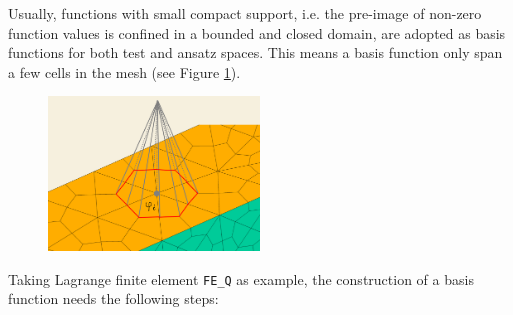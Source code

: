 \documentclass[11pt, a4paper]{book}
\begin{document}
Usually, functions with small compact support, i.e. the pre-image of non-zero function
values is confined in a bounded and closed domain, are adopted as basis functions for both
test and ansatz spaces. This means a basis function only span a few cells in the mesh (see
Figure \ref{fig:basis-function-with-compact-support}).
\begin{figure}[htbp]
  \centering
  \includegraphics[width=0.5\textwidth, height=\textheight,
  keepaspectratio]{figures/basis-function-with-compact-support-on-mesh-draft}
  \caption{}
  \label{fig:basis-function-with-compact-support}
\end{figure}
Taking Lagrange finite element \texttt{FE\_Q} as example, the construction of a basis
function needs the following steps:
\end{document}
